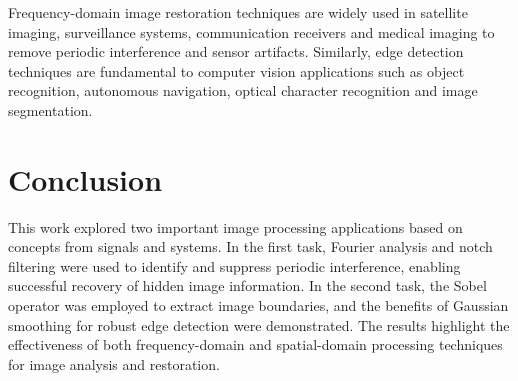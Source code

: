 \documentclass[10pt, a4paper, twocolumn]{article}
\begin{document}
Frequency-domain image restoration techniques are widely used in satellite imaging, surveillance systems, communication receivers and medical imaging to remove periodic interference and sensor artifacts. Similarly, edge detection techniques are fundamental to computer vision applications such as object recognition, autonomous navigation, optical character recognition and image segmentation.

\section{Conclusion}

This work explored two important image processing applications based on concepts from signals and systems. In the first task, Fourier analysis and notch filtering were used to identify and suppress periodic interference, enabling successful recovery of hidden image information. In the second task, the Sobel operator was employed to extract image boundaries, and the benefits of Gaussian smoothing for robust edge detection were demonstrated. The results highlight the effectiveness of both frequency-domain and spatial-domain processing techniques for image analysis and restoration.
\end{document}
